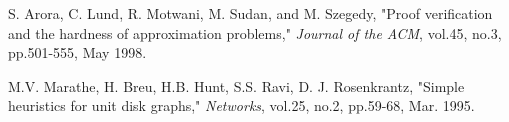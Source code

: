 \documentclass[journal,10pt]{IEEEtran}
\begin{document}
\begin{thebibliography}{11}
S. Arora, C. Lund, R. Motwani, M. Sudan, and M. Szegedy, "Proof verification and the hardness of approximation problems," \textit{Journal of the ACM}, vol.45, no.3, pp.501-555, May 1998.

M.V. Marathe, H. Breu, H.B. Hunt, S.S. Ravi, D. J. Rosenkrantz, "Simple heuristics for unit disk graphs," \textit{Networks}, vol.25, no.2, pp.59-68, Mar. 1995.

\end{thebibliography}


\end{document}
